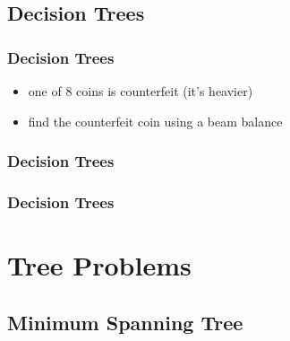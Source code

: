 \documentclass[dvipsnames]{beamer}
\begin{document}
\subsection{Decision Trees}


\begin{frame}
  \frametitle{Decision Trees}

  \begin{example}
    \begin{itemize}
      \item one of 8 coins is counterfeit (it's heavier)
      \item find the counterfeit coin using a beam balance
    \end{itemize}
  \end{example}
\end{frame}

\begin{frame}
  \frametitle{Decision Trees}

  \begin{example}[in 3 weighings]
    \begin{center}
    \end{center}
  \end{example}
\end{frame}

\begin{frame}
  \frametitle{Decision Trees}

  \begin{example}[in 2 weighings]
    \begin{center}
    \end{center}
  \end{example}
\end{frame}


\section{Tree Problems}

\subsection{Minimum Spanning Tree}
\end{document}
